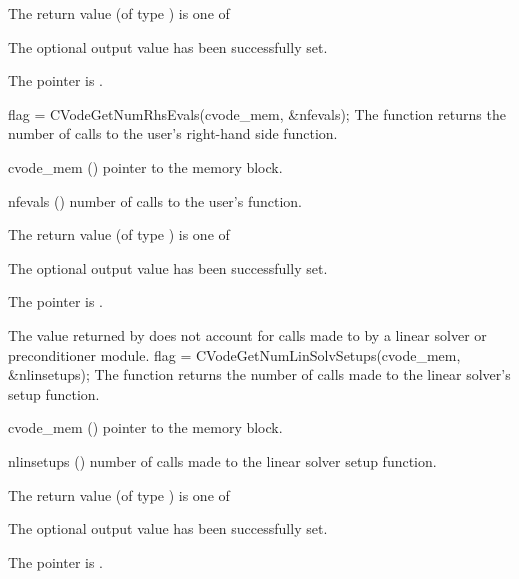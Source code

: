 {
  The return value  (of type ) is one of
  \begin{args}
  \item[\Id{CV\_SUCCESS}] 
    The optional output value has been successfully set.
  \item[\Id{CV\_MEM\_NULL}]
    The  pointer is .
  \end{args}
}
{}
{
  flag = CVodeGetNumRhsEvals(cvode\_mem, \&nfevals);
}
{
  The function  returns the 
  number of calls to the user's right-hand side function.
}
{
  \begin{args}
  \item[cvode\_mem] ()
    pointer to the {\cvodes} memory block.
  \item[nfevals] ()
    number of calls to the user's  function.
  \end{args}
}
{
  The return value  (of type ) is one of
  \begin{args}
  \item[\Id{CV\_SUCCESS}] 
    The optional output value has been successfully set.
  \item[\Id{CV\_MEM\_NULL}]
    The  pointer is .
  \end{args}
}
{
  The  value returned by  does not
  account for calls made to  by a linear solver or preconditioner 
  module. 
}
{
  flag = CVodeGetNumLinSolvSetups(cvode\_mem, \&nlinsetups);
}
{
  The function  returns the
  number of calls made to the linear solver's setup function.
}
{
  \begin{args}[nlinsetups]
  \item[cvode\_mem] ()
    pointer to the {\cvodes} memory block.
  \item[nlinsetups] ()
    number of calls made to the linear solver setup function.
  \end{args}
}
{
  The return value  (of type ) is one of
  \begin{args}
  \item[\Id{CV\_SUCCESS}] 
    The optional output value has been successfully set.
  \item[\Id{CV\_MEM\_NULL}]
    The  pointer is .
  \end{args}
}
